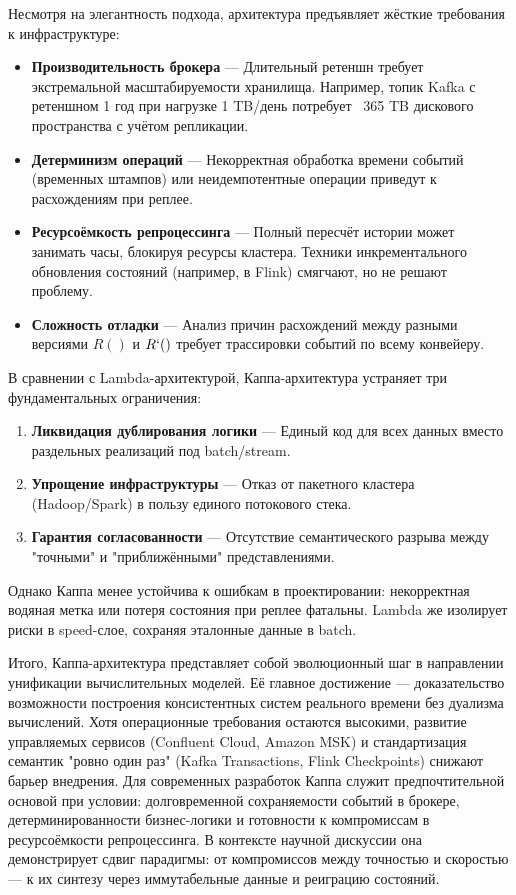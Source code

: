             Несмотря на элегантность подхода, архитектура предъявляет жёсткие требования к инфраструктуре:
            \begin{itemize}
                \item \textbf{Производительность брокера} — Длительный ретеншн требует экстремальной масштабируемости хранилища. Например, топик Kafka с ретеншном 1 год при нагрузке 1 TB/день потребует ~365 TB дискового пространства с учётом репликации.
                \item \textbf{Детерминизм операций} — Некорректная обработка времени событий (временных штампов) или неидемпотентные операции приведут к расхождениям при реплее.
                \item \textbf{Ресурсоёмкость репроцессинга} — Полный пересчёт истории может занимать часы, блокируя ресурсы кластера. Техники инкрементального обновления состояний (например, в Flink) смягчают, но не решают проблему.
                \item \textbf{Сложность отладки} — Анализ причин расхождений между разными версиями $R()$ и $R`()$ требует трассировки событий по всему конвейеру.
            \end{itemize}

            
            В сравнении с Lambda-архитектурой, Каппа-архитектура устраняет три фундаментальных ограничения:
            \begin{enumerate}
                \item \textbf{Ликвидация дублирования логики} — Единый код для всех данных вместо раздельных реализаций под batch/stream.
                \item \textbf{Упрощение инфраструктуры} — Отказ от пакетного кластера (Hadoop/Spark) в пользу единого потокового стека.
                \item \textbf{Гарантия согласованности} — Отсутствие семантического разрыва между "точными" и "приближёнными" представлениями.
            \end{enumerate}

            
            Однако Каппа менее устойчива к ошибкам в проектировании: некорректная водяная метка или потеря состояния при реплее фатальны. Lambda же изолирует риски в speed-слое, сохраняя эталонные данные в batch.

            
            Итого, Каппа-архитектура представляет собой эволюционный шаг в направлении унификации вычислительных моделей. Её главное достижение — доказательство возможности построения консистентных систем реального времени без дуализма вычислений. Хотя операционные требования остаются высокими, развитие управляемых сервисов (Confluent Cloud, Amazon MSK) и стандартизация семантик "ровно один раз" (Kafka Transactions, Flink Checkpoints) снижают барьер внедрения. Для современных разработок Каппа служит предпочтительной основой при условии: долговременной сохраняемости событий в брокере, детерминированности бизнес-логики и готовности к компромиссам в ресурсоёмкости репроцессинга. В контексте научной дискуссии она демонстрирует сдвиг парадигмы: от компромиссов между точностью и скоростью — к их синтезу через иммутабельные данные и реиграцию состояний.


